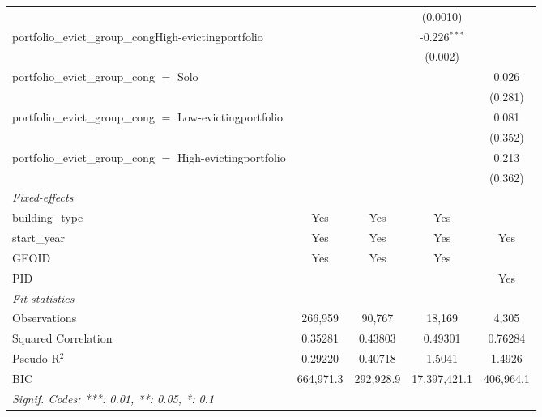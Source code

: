 \begin{tabular}{lcccc}
                                                               &                &                & (0.0010)       &   \\   
   portfolio\_evict\_group\_congHigh-evictingportfolio         &                &                & -0.226$^{***}$ &   \\   
                                                               &                &                & (0.002)        &   \\   
   portfolio\_evict\_group\_cong $=$ Solo                      &                &                &                & 0.026\\   
                                                               &                &                &                & (0.281)\\   
   portfolio\_evict\_group\_cong $=$ Low-evictingportfolio     &                &                &                & 0.081\\   
                                                               &                &                &                & (0.352)\\   
   portfolio\_evict\_group\_cong $=$ High-evictingportfolio    &                &                &                & 0.213\\   
                                                               &                &                &                & (0.362)\\   
   \midrule
   \emph{Fixed-effects}\\
   building\_type                                              & Yes            & Yes            & Yes            & \\  
   start\_year                                                 & Yes            & Yes            & Yes            & Yes\\  
   GEOID                                                       & Yes            & Yes            & Yes            & \\  
   PID                                                         &                &                &                & Yes\\  
   \midrule
   \emph{Fit statistics}\\
   Observations                                                & 266,959        & 90,767         & 18,169         & 4,305\\  
   Squared Correlation                                         & 0.35281        & 0.43803        & 0.49301        & 0.76284\\  
   Pseudo R$^2$                                                & 0.29220        & 0.40718        & 1.5041         & 1.4926\\  
   BIC                                                         & 664,971.3      & 292,928.9      & 17,397,421.1   & 406,964.1\\  
   \midrule \midrule
   \multicolumn{5}{l}{\emph{Signif. Codes: ***: 0.01, **: 0.05, *: 0.1}}\\
\end{tabular}
\par\endgroup
